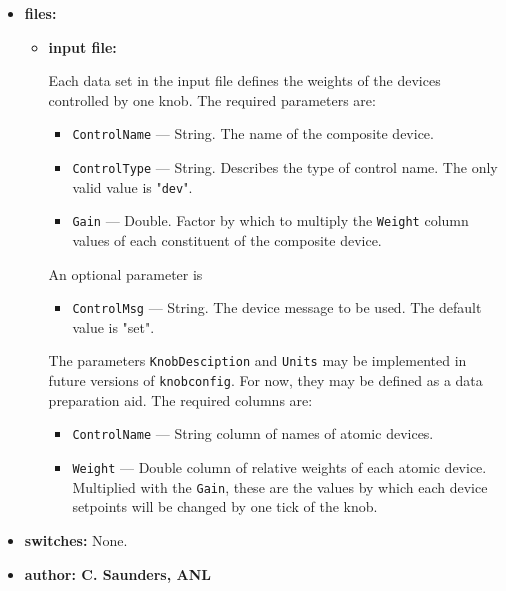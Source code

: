 \begin{itemize}
\item {\bf files:}
\begin{itemize}
\item {\bf input file:}\par
Each data set in the input file defines the weights of the devices controlled
by one knob. 
The required parameters are:
\begin{itemize}
        \item {\tt ControlName} --- String. The name of the composite device.
        \item {\tt ControlType} --- String. Describes the type of control name.
                The only valid value is "\verb+dev+".
        \item {\tt Gain} --- Double. Factor by which to multiply the 
                {\tt Weight} column values of each constituent of the
                composite device.
\end{itemize}
An optional parameter is
\begin{itemize}
        \item {\tt ControlMsg} --- String. The device message to be used. The
        default value is "set".
\end{itemize}
The parameters \verb+KnobDesciption+ and \verb+Units+ may be implemented in future versions
of \verb+knobconfig+. For now, they may be defined as a data preparation aid.
The required columns are:
\begin{itemize}
        \item {\tt ControlName} --- String column of names of atomic devices.
        \item {\tt Weight} --- Double column of relative weights of each atomic device.
        Multiplied with the \verb+Gain+, these are the values by which each device
        setpoints will be changed by one tick of the knob.
\end{itemize}
\end{itemize}
%
\item {\bf switches:}
%
%
    None.

\item {\bf author: C. Saunders, ANL} 
\end{itemize}
